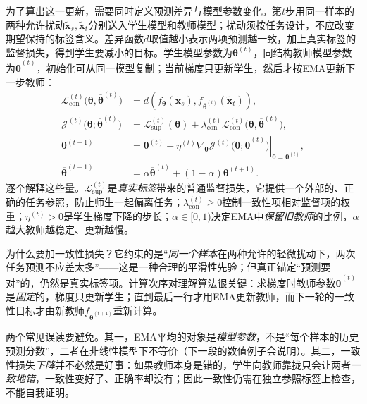 为了算出这一更新，需要同时定义预测差异与模型参数变化。第$t$步用同一样本的两种允许扰动$\widetilde{\bm{x}}_s,\widetilde{\bm{x}}_t$分别送入学生模型和教师模型；扰动须按任务设计，不应改变期望保持的标签含义。差异函数$d$取值越小表示两项预测越一致，加上真实标签的监督损失，得到学生要减小的目标。学生模型参数为$\bm{\theta}^{(t)}$，同结构教师模型参数为$\overline{\bm{\theta}}^{(t)}$，初始化可从同一模型复制；当前梯度只更新学生，然后才按EMA更新下一步教师：
\begin{equation}
  \begin{aligned}
    \mathcal{L}_{\mathrm{con}}^{(t)}
      \bigl(\bm{\theta},\overline{\bm{\theta}}^{(t)}\bigr)
    &=
    d\!\left(
      f_{\bm{\theta}}(\widetilde{\bm{x}}_s),
      f_{\overline{\bm{\theta}}^{(t)}}(\widetilde{\bm{x}}_t)
    \right), \\
    \mathcal{J}^{(t)}
      \bigl(\bm{\theta};\overline{\bm{\theta}}^{(t)}\bigr)
    &=
    \mathcal{L}_{\mathrm{sup}}^{(t)}(\bm{\theta})
    +\lambda_{\mathrm{con}}^{(t)}
      \mathcal{L}_{\mathrm{con}}^{(t)}
      \bigl(\bm{\theta},\overline{\bm{\theta}}^{(t)}\bigr), \\
    \bm{\theta}^{(t+1)}
    &=
    \bm{\theta}^{(t)}
    -\eta^{(t)}
      \left.
      \nabla_{\bm{\theta}}\mathcal{J}^{(t)}
      \bigl(\bm{\theta};\overline{\bm{\theta}}^{(t)}\bigr)
      \right|_{\bm{\theta}=\bm{\theta}^{(t)}}, \\
    \overline{\bm{\theta}}^{(t+1)}
    &=
    \alpha\overline{\bm{\theta}}^{(t)}
    +(1-\alpha)\bm{\theta}^{(t+1)}.
  \end{aligned}
  \label{eq:knowledge-acquisition-mean-teacher}
\end{equation}
逐个解释这些量。$\mathcal{L}_{\mathrm{sup}}^{(t)}$是\emph{真实标签}带来的普通监督损失，它提供一个外部的、正确的任务参照，防止师生一起偏离任务；$\lambda_{\mathrm{con}}^{(t)}\geq0$控制一致性项相对监督项的权重；$\eta^{(t)}>0$是学生梯度下降的步长；$\alpha\in[0,1)$决定EMA中\emph{保留旧教师}的比例，$\alpha$越大教师越稳定、更新越慢。

为什么要加一致性损失？它约束的是“\emph{同一个样本}在两种允许的轻微扰动下，两次任务预测不应差太多”——这是一种合理的平滑性先验；但真正锚定“预测要对”的，仍然是真实标签项。计算次序对理解算法很关键：求梯度时教师参数$\overline{\bm{\theta}}^{(t)}$是\emph{固定}的，梯度只更新学生；直到最后一行才用EMA更新教师，而下一轮的一致性目标才由新教师$f_{\overline{\bm{\theta}}^{(t+1)}}$重新计算。

两个常见误读要避免。其一，EMA平均的对象是\emph{模型参数}，不是“每个样本的历史预测分数”，二者在非线性模型下不等价（下一段的数值例子会说明）。其二，一致性损失\emph{下降}并不必然是好事：如果教师本身是错的，学生向教师靠拢只会让两者\emph{一致地错}，一致性变好了、正确率却没有；因此一致性仍需在独立参照标签上检查，不能自我证明。

